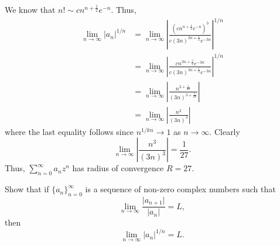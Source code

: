 \documentclass[12 pt, letterpaper]{hmcpset}
\begin{document}
\begin{solution}
\begin{enumerate}
			We know that $n! \sim cn^{n + \frac{1}{2}} e^{-n}$. Thus,
			\[
				\begin{split}
					\lim_{n \to \infty} \lvert a_{n} \rvert^{1/n} & = \lim_{n \to \infty} \left \lvert \frac{\left ( cn^{n + \frac{1}{2}} e^{-n} \right )^{3}}{c(3n)^{3n + \frac{1}{2}} e^{-3n}} \right \rvert^{1/n} \\
										      & = \lim_{n \to \infty} \left \lvert \frac{cn^{3n + \frac{3}{2}} e^{-3n}}{c(3n)^{3n + \frac{1}{2}} e^{-3n}} \right \rvert^{1/n} \\
										      & = \lim_{n \to \infty} \left \lvert \frac{n^{3 + \frac{1}{2n}}}{(3n)^{3 + \frac{1}{2n}}} \right \rvert \\
										      & = \lim_{n \to \infty} \left \lvert \frac{n^{3}}{(3n)^{3}} \right \rvert
				\end{split}
			\]
			where the last equality follows since $n^{1/kn} \to 1$ as $n \to \infty$. Clearly
			\[
				\lim_{n \to \infty} \left \lvert \frac{n^{3}}{(3n)^{3}} \right \rvert = \frac{1}{27}.
			\]
			Thus, $\sum_{n = 0}^{\infty} a_{n} z^{n}$ has radius of convergence $R = 27$.
	\end{enumerate}
\end{solution}

\pagebreak

\begin{problem}[17.]
	Show that if $\{ a_{n} \}_{n = 0}^{\infty}$ is a sequence of non-zero complex numbers such that
	\[
		\lim_{n \to \infty} \frac{\lvert a_{n + 1} \rvert}{\lvert a_{n} \rvert} = L,
	\]
	then
	\[
		\lim_{n \to \infty} \lvert a_{n} \rvert^{1/n} = L.
	\]
\end{problem}
\end{document}
